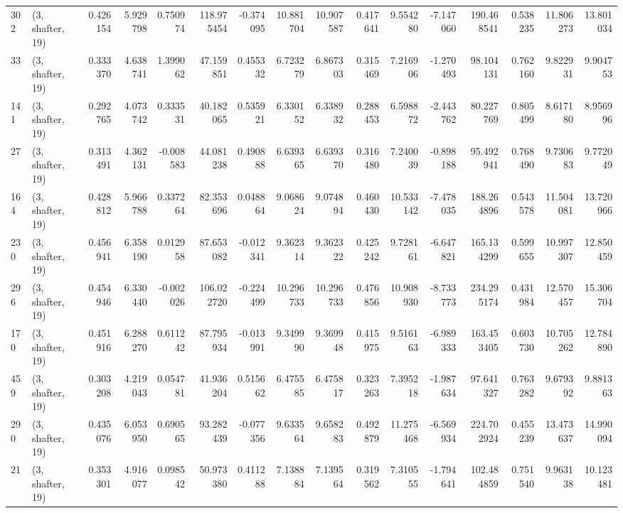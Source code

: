 \begin{tabular}{llrrrrrrrrrrrrrr}
302 &  (3, shafter, 19) &   0.426154 &   5.929798 &   0.750974 &   118.975454 &  -0.374095 &  10.881704 &  10.907587 &  0.417641 &   9.554280 &  -7.147060 &   190.468541 &   0.538235 &  11.806273 &  13.801034 \\
33  &  (3, shafter, 19) &   0.333370 &   4.638741 &   1.399062 &    47.159851 &   0.455332 &   6.723279 &   6.867303 &  0.315469 &   7.216906 &  -1.270493 &    98.104131 &   0.762160 &   9.822931 &   9.904753 \\
141 &  (3, shafter, 19) &   0.292765 &   4.073742 &   0.333531 &    40.182065 &   0.535921 &   6.330152 &   6.338932 &  0.288453 &   6.598872 &  -2.443762 &    80.227769 &   0.805499 &   8.617180 &   8.956996 \\
27  &  (3, shafter, 19) &   0.313491 &   4.362131 &  -0.008583 &    44.081238 &   0.490888 &   6.639365 &   6.639370 &  0.316480 &   7.240039 &  -0.898188 &    95.492941 &   0.768490 &   9.730683 &   9.772049 \\
164 &  (3, shafter, 19) &   0.428812 &   5.966788 &   0.337264 &    82.353696 &   0.048864 &   9.068624 &   9.074894 &  0.460430 &  10.533142 &  -7.478035 &   188.264896 &   0.543578 &  11.504081 &  13.720966 \\
230 &  (3, shafter, 19) &   0.456941 &   6.358190 &   0.012958 &    87.653082 &  -0.012341 &   9.362314 &   9.362322 &  0.425242 &   9.728161 &  -6.647821 &   165.134299 &   0.599655 &  10.997307 &  12.850459 \\
296 &  (3, shafter, 19) &   0.454946 &   6.330440 &  -0.002026 &   106.022720 &  -0.224499 &  10.296733 &  10.296733 &  0.476856 &  10.908930 &  -8.733773 &   234.295174 &   0.431984 &  12.570457 &  15.306704 \\
170 &  (3, shafter, 19) &   0.451916 &   6.288270 &   0.611242 &    87.795934 &  -0.013991 &   9.349990 &   9.369948 &  0.415975 &   9.516163 &  -6.989333 &   163.453405 &   0.603730 &  10.705262 &  12.784890 \\
459 &  (3, shafter, 19) &   0.303208 &   4.219043 &   0.054781 &    41.936204 &   0.515662 &   6.475585 &   6.475817 &  0.323263 &   7.395218 &  -1.987634 &    97.641327 &   0.763282 &   9.679392 &   9.881363 \\
290 &  (3, shafter, 19) &   0.435076 &   6.053950 &   0.690565 &    93.282439 &  -0.077356 &   9.633564 &   9.658283 &  0.492879 &  11.275468 &  -6.569934 &   224.702924 &   0.455239 &  13.473637 &  14.990094 \\
21  &  (3, shafter, 19) &   0.353301 &   4.916077 &   0.098542 &    50.973380 &   0.411288 &   7.138884 &   7.139564 &  0.319562 &   7.310555 &  -1.794641 &   102.484859 &   0.751540 &   9.963138 &  10.123481 \\

\end{tabular}
